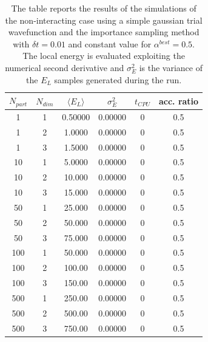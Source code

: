 \begin{table}[H]
    \centering
    \begin{tabular}{cccccc}
    $N_{part}$ & $N_{dim}$ & $\langle E_L \rangle$ & $\sigma^2_E$ & $t_{CPU}$ & acc. ratio \\
    \midrule
    1 & 1 & 0.50000 & 0.00000 & 0 & 0.5 \\
    1 & 2 & 1.0000 & 0.00000 & 0 & 0.5 \\
    1 & 3 & 1.5000 & 0.00000 & 0 & 0.5 \\
    \midrule
    10 & 1 & 5.0000 & 0.00000 & 0 & 0.5 \\
    10 & 2 & 10.000 & 0.00000 & 0 & 0.5 \\
    10 & 3 & 15.000 & 0.00000 & 0 & 0.5 \\
    \midrule
    50 & 1 & 25.000 & 0.00000 & 0 & 0.5 \\
    50 & 2 & 50.000 & 0.00000 & 0 & 0.5 \\
    50 & 3 & 75.000 & 0.00000 & 0 & 0.5 \\
    \midrule
    100 & 1 & 50.000 & 0.00000 & 0 & 0.5 \\
    100 & 2 & 100.00 & 0.00000 & 0 & 0.5 \\
    100 & 3 & 150.00 & 0.00000 & 0 & 0.5 \\
    \midrule
    500 & 1 & 250.00 & 0.00000 & 0 & 0.5 \\
    500 & 2 & 500.00 & 0.00000 & 0 & 0.5 \\
    500 & 3 & 750.00 & 0.00000 & 0 & 0.5 \\
    \bottomrule
    \end{tabular}
    \caption{The table reports the results of the simulations of the non-interacting case using a simple gaussian trial wavefunction and the importance sampling method with $\delta t = 0.01$ and constant value for  $\alpha^{best}=0.5$. The local energy is evaluated exploiting the numerical second derivative and $\sigma_E^2$ is the variance of the $E_L$ samples generated during the run. }
    \label{tab:tab_x_importance_numerical}
\end{table}

